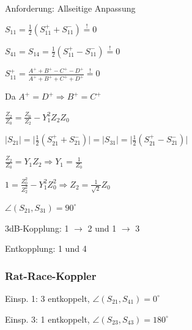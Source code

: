 Anforderung: Allseitige Anpassung
\begin{pitemize}
    \item $S_{11} = \frac{1}{2}(S_{11}^+ + S_{11}^-) \overset{!}{=} 0$
    \item $S_{41} = S_{14} = \frac{1}{2}(S_{11}^+ - S_{11}^-) \overset{!}{=} 0$
    \item $S_{11}^+ = \frac{A^+ + B^+ - C^+ - D^+}{A^+ + B^+ + C^+ + D^+} \overset{!}{=} 0$
    \item Da $A^+ = D^+ \Rightarrow B^+ = C^+$
    \item $\frac{Z_2}{Z_0} = \frac{Z_0}{Z_2} - Y_1^2 Z_2 Z_0$
    \item $|S_{21}| = \lvert\frac{1}{2} \left(S_{21}^+ + S_{21}^-\right)\rvert = |S_{31}| = \lvert\frac{1}{2} \left(S_{21}^+ - S_{21}^-\right)\rvert$
    \item $\frac{Z_2}{Z_0} = Y_1 Z_2 \Rightarrow Y_1 = \frac{1}{Z_0}$
    \item $1 = \frac{Z_0^2}{Z_2^2} - Y_1^2Z_0^2 \Rightarrow Z_2 = \frac{1}{\sqrt{2}}Z_0$
\end{pitemize}

\begin{pitemize}
    \item $\angle(S_{21}, S_{31}) = 90^\circ$
    \item 3dB-Kopplung: 1 $\rightarrow$ 2 und 1 $\rightarrow$ 3
    \item Entkopplung: 1 und 4
\end{pitemize}


\subsubsection{Rat-Race-Koppler}
\fb
\begin{pitemize}
    \item Einsp. 1: 3 entkoppelt, $\angle(S_{21}, S_{41}) = 0^\circ$
    \item Einsp. 3: 1 entkoppelt, $\angle(S_{23}, S_{43}) = 180^\circ$
\end{pitemize}